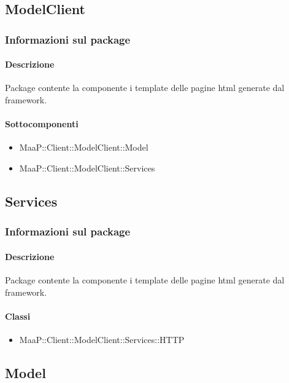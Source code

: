 \subsection{ModelClient}
\subsubsection{Informazioni sul package}
\paragraph{Descrizione}
Package contente la componente i template delle pagine html generate dal framework.

\paragraph{Sottocomponenti}
\begin{itemize}
\item MaaP::Client::ModelClient::Model
\item MaaP::Client::ModelClient::Services
\end{itemize}

\subsection{Services}
\subsubsection{Informazioni sul package}
\paragraph{Descrizione}
Package contente la componente i template delle pagine html generate dal framework.

\paragraph{Classi}
\begin{itemize}
\item MaaP::Client::ModelClient::Services::HTTP
\end{itemize}


\subsection{Model}
